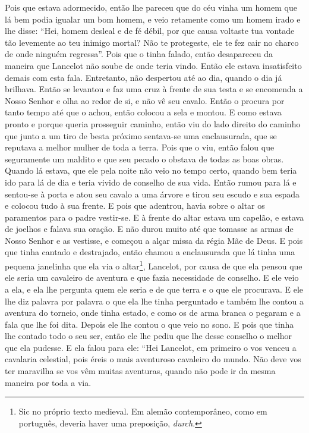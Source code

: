 Pois que estava adormecido, então lhe pareceu que do céu vinha um homem que lá
bem podia igualar um bom homem, e veio retamente como um homem irado e lhe
disse: “Hei, homem desleal e de fé débil, por que causa voltaste tua vontade
tão levemente ao teu inimigo mortal? Não te protegeste, ele te fez cair no
charco de onde ninguém regressa”. Pois que o tinha falado, então desapareceu da
maneira que Lancelot não soube de onde teria vindo. Então ele estava
insatisfeito demais com esta fala. Entretanto, não despertou até ao dia, quando
o dia já brilhava. Então se levantou e faz uma cruz à frente de sua testa e se
encomenda a Nosso Senhor e olha ao redor de si, e não vê seu cavalo. Então o
procura por tanto tempo até que o achou, então colocou a sela e montou. E como
estava pronto e porque queria prosseguir caminho, então viu do lado direito do
caminho que junto a um tiro de besta próximo sentava-se uma enclausurada, que
se reputava a melhor mulher de toda a terra. Pois que o viu, então falou que
seguramente um maldito e que seu pecado o obstava de todas as boas obras.
Quando lá estava, que ele pela noite não veio no tempo certo, quando bem teria
ido para lá de dia e teria vivido de conselho de sua vida. Então rumou para lá
e sentou-se à porta e atou seu cavalo a uma árvore e tirou seu escudo e sua
espada e colocou tudo à sua frente. E pois que adentrou, havia sobre o altar os
paramentos para o padre vestir-se. E à frente do altar estava um capelão, e
estava de joelhos e falava sua oração. E não durou muito até que tomasse as
armas de Nosso Senhor e as vestisse, e começou a alçar missa da régia Mãe de
Deus. E pois que tinha cantado e destrajado, então chamou a enclausurada que lá
tinha uma pequena janelinha que ela via o altar\footnote{ Sic no próprio texto
medieval. Em alemão contemporâneo, como em português, deveria haver uma
preposição, \textit{durch}.},  Lancelot, por
causa de que ela pensou que ele seria um cavaleiro de aventura e que fazia
necessidade de conselho. E ele veio a ela, e ela lhe pergunta quem ele seria e
de que terra e o que ele procurava. E ele lhe diz palavra por palavra o que ela
lhe tinha perguntado e também lhe contou a aventura do torneio, onde tinha
estado, e como os de arma branca o pegaram e a fala que lhe foi dita. Depois
ele lhe contou o que veio no sono. E pois que tinha lhe contado todo o seu ser,
então ele lhe pediu que lhe desse conselho o melhor que ela pudesse. E ela
falou para ele: “Hei Lancelot, em primeiro o vos venceu a cavalaria celestial,
pois éreis o mais aventuroso cavaleiro do mundo. Não deve vos ter maravilha se
vos vêm muitas aventuras, quando não pode ir da mesma maneira por toda a via.
